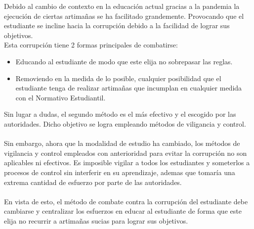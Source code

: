 \documentclass{article}
\begin{document}
Debido al cambio de contexto en la educación actual gracias a la 
pandemia la ejecución de ciertas artimañas se ha facilitado 
grandemente. Provocando que el estudiante se incline hacia la corrupción
debido a la facilidad de lograr sus objetivos. \\
Esta corrupción tiene 2 formas principales de combatirse: \\
\begin{itemize} 
        \item Educando al estudiante de modo que este elija no sobrepasar las reglas.
        \item Removiendo en la medida de lo posible, cualquier posibilidad
                que el estudiante tenga de realizar artimañas que 
                incumplan en cualquier medida con el 
                Normativo Estudiantil.
\end{itemize}
Sin lugar a dudas, el segundo método es el más efectivo y el escogido 
por las autoridades. Dicho objetivo se logra empleando métodos 
de viligancia y control.  \\\\
Sin embargo, ahora que la modalidad de estudio ha cambiado, los métodos
de vigilancia y control empleados con anterioridad para evitar la 
corrupción no son aplicables ni efectivos. 
Es imposible vigilar a todos los estudiantes y someterlos a procesos
de control sin interferir en su aprendizaje, ademas que tomaría una 
extrema cantidad de esfuerzo por parte de las autoridades. \\\\
En vista de esto, el método de combate contra la corrupción del 
estudiante debe cambiarse y centralizar los esfuerzos en educar 
al estudiante de forma que este elija no recurrir a artimañas sucias 
para lograr sus objetivos.
\end{document}
